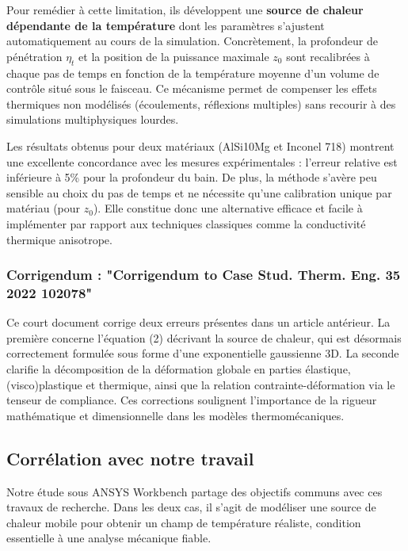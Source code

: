\documentclass{rapportECL}
\begin{document}
Pour remédier à cette limitation, ils développent une \textbf{source de chaleur dépendante de la température} dont les paramètres s’ajustent automatiquement au cours de la simulation. Concrètement, la profondeur de pénétration \(\eta_t\) et la position de la puissance maximale \(z_0\) sont recalibrées à chaque pas de temps en fonction de la température moyenne d’un volume de contrôle situé sous le faisceau. Ce mécanisme permet de compenser les effets thermiques non modélisés (écoulements, réflexions multiples) sans recourir à des simulations multiphysiques lourdes.

Les résultats obtenus pour deux matériaux (AlSi10Mg et Inconel 718) montrent une excellente concordance avec les mesures expérimentales : l’erreur relative est inférieure à 5\% pour la profondeur du bain. De plus, la méthode s’avère peu sensible au choix du pas de temps et ne nécessite qu’une calibration unique par matériau (pour \(z_0\)). Elle constitue donc une alternative efficace et facile à implémenter par rapport aux techniques classiques comme la conductivité thermique anisotrope.

\subsubsection{Corrigendum : "Corrigendum to Case Stud. Therm. Eng. 35 2022 102078"}

Ce court document corrige deux erreurs présentes dans un article antérieur. La première concerne l’équation (2) décrivant la source de chaleur, qui est désormais correctement formulée sous forme d’une exponentielle gaussienne 3D. La seconde clarifie la décomposition de la déformation globale en parties élastique, (visco)plastique et thermique, ainsi que la relation contrainte-déformation via le tenseur de compliance. Ces corrections soulignent l’importance de la rigueur mathématique et dimensionnelle dans les modèles thermomécaniques.

\subsection{Corrélation avec notre travail}

Notre étude sous ANSYS Workbench partage des objectifs communs avec ces travaux de recherche. Dans les deux cas, il s’agit de modéliser une source de chaleur mobile pour obtenir un champ de température réaliste, condition essentielle à une analyse mécanique fiable.
\end{document}

